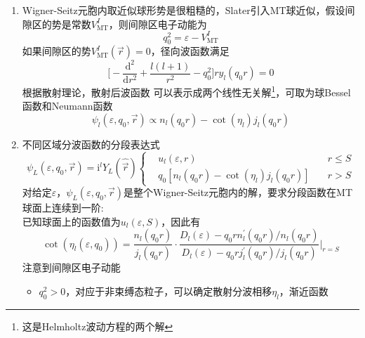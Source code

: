 {\begin{enumerate}
\item \textrm{Wigner-Seitz}元胞内取近似球形势是很粗糙的，\textrm{Slater}引入\textrm{MT}球近似，假设间隙区的势是常数$V_{\mathrm{MT}}^I$，则间隙区电子动能为
				\begin{displaymath}
					q_0^2=\varepsilon-V_{\mathrm{MT}}^I
				\end{displaymath}
				如果间隙区的势$V_{\mathrm{MT}}^I(\vec r)=0$，径向波函数满足
				\begin{displaymath}
					\bigg[-\dfrac{\mathrm{d}^2}{\mathrm{d}r^2}+\dfrac{l(l+1)}{r^2}-q_0^2\bigg]ry_l(q_0r)=0
				\end{displaymath}
				根据散射理论，散射后波函数%
				可以表示成两个线性无关解\footnote{\tiny{这是\textrm{Helmholtz}}波动方程的两个解}，可取为球\textrm{Bessel}函数和\textrm{Neumann}函数
				\begin{displaymath}
					\psi_l(\varepsilon,q_0,\vec r)\propto n_l(q_0r)-\cot(\eta_l)j_l(q_0r) 
				\end{displaymath}
			\item 不同区域分波函数的分段表达式
				\begin{displaymath}
					\psi_L(\varepsilon,q_0,\vec r)=\mathrm{i}^{l}Y_L(\hat{\vec r})\left\{
						\begin{aligned}
							&u_l(\varepsilon,r)\quad &r\leqslant S\\
							&q_0[n_l(q_0r)-\cot(\eta_l)j_l(q_0r)]\quad &r>S
						\end{aligned} \right.
				\end{displaymath}
				对给定$\varepsilon$，$\psi_L(\varepsilon,q_0,\vec r)$是整个\textrm{Wigner-Seitz}元胞内的解，要求分段函数在\textrm{MT}球面上连续到一阶:\\
				已知球面上的函数值为$u_l(\varepsilon,S)$，因此有
				\begin{displaymath}
					\cot(\eta_l(\varepsilon,q_0))=\dfrac{n_l(q_0r)}{j_l(q_0r)}\cdot\dfrac{D_l(\varepsilon)-q_0rn_l^{\prime}(q_0r)/n_l(q_0r)}{D_l(\varepsilon)-q_0rj_l^{\prime}(q_0r)/j_l(q_0r)}\bigg|_{r=S}
				\end{displaymath}
				注意到间隙区电子动能
				\begin{itemize}
					\item $q_0^2>0$，对应于非束缚态粒子，可以确定散射分波相移$\eta_l$，渐近函数

\end{itemize}
\end{enumerate}}
